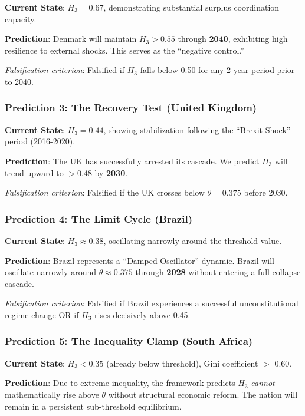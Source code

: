 \documentclass[11pt,a4paper]{article}
\newcommand{\Hthree}{H_3}
\begin{document}
\textbf{Current State}: $\Hthree = 0.67$, demonstrating substantial surplus coordination capacity.

\textbf{Prediction}: Denmark will maintain $\Hthree > 0.55$ through \textbf{2040}, exhibiting high resilience to external shocks. This serves as the ``negative control.''

\textit{Falsification criterion}: Falsified if $\Hthree$ falls below 0.50 for any 2-year period prior to 2040.

\subsubsection{Prediction 3: The Recovery Test (United Kingdom)}

\textbf{Current State}: $\Hthree = 0.44$, showing stabilization following the ``Brexit Shock'' period (2016-2020).

\textbf{Prediction}: The UK has successfully arrested its cascade. We predict $\Hthree$ will trend upward to $>$0.48 by \textbf{2030}.

\textit{Falsification criterion}: Falsified if the UK crosses below $\theta = 0.375$ before 2030.

\subsubsection{Prediction 4: The Limit Cycle (Brazil)}

\textbf{Current State}: $\Hthree \approx 0.38$, oscillating narrowly around the threshold value.

\textbf{Prediction}: Brazil represents a ``Damped Oscillator'' dynamic. Brazil will oscillate narrowly around $\theta \approx 0.375$ through \textbf{2028} without entering a full collapse cascade.

\textit{Falsification criterion}: Falsified if Brazil experiences a successful unconstitutional regime change OR if $\Hthree$ rises decisively above 0.45.

\subsubsection{Prediction 5: The Inequality Clamp (South Africa)}

\textbf{Current State}: $\Hthree < 0.35$ (already below threshold), Gini coefficient $>$ 0.60.

\textbf{Prediction}: Due to extreme inequality, the framework predicts $\Hthree$ \textit{cannot} mathematically rise above $\theta$ without structural economic reform. The nation will remain in a persistent sub-threshold equilibrium.
\end{document}
